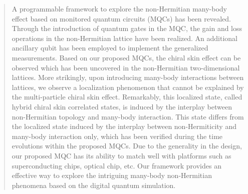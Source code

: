 \documentclass[longbibliography, aps, prx, amsmath, amssymb, amsfonts, twocolumn,superscriptaddress, footinbib]{revtex4-1}
\begin{document}
	
	
	
	\begin{abstract}

		A programmable framework to explore the non-Hermitian many-body effect based on monitored quantum circuits (MQCs) has been revealed. Through the introduction of quantum gates in the MQC, the gain and loss operations in the non-Hermitian lattice have been realized. An additional ancillary qubit has been employed to implement the generalized measurements. Based on our proposed MQCs, the chiral skin effect can be observed which has been uncovered in the non-Hermitian two-dimensional lattices. More strikingly, upon introducing many-body interactions between lattices, we observe a localization phenomenon that cannot be explained by the multi-particle chiral skin effect. Remarkably, this localized state, called hybrid chiral skin correlated states, is induced by the interplay between non-Hermitian topology and many-body interaction. This state differs from the localized state induced by the interplay between non-Hermiticity and many-body interaction only, which has been verified during the time evolutions within the proposed MQCs. Due to the generality in the design, our proposed MQC has its ability to match well with platforms such as superconducting chips, optical chip, etc. 
		Our framework provides an effective way to explore the intriguing many-body non-Hermitian phenomena based on the digital quantum simulation.



\end{abstract}
\end{document}
